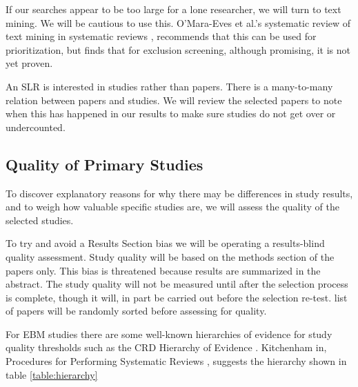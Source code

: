 If our searches appear to be too large for a lone researcher, we will turn to text mining.  
We will be cautious to use this.
O'Mara-Eves et al.'s systematic review of text mining in systematic reviews \cite{OMara-Eves_2015}, recommends that this can be used for prioritization, but finds that for exclusion screening, although promising, it is not yet proven.

An SLR is interested in studies rather than papers.
There is a many-to-many relation between papers and studies.
We will review the selected papers to note when this has happened in our results to make sure studies do not get over or undercounted.

\subsection{Quality of Primary Studies}
To discover explanatory reasons for why there may be differences in study results, and to weigh how valuable specific studies are, we will assess the quality of the selected studies.

To try and avoid a Results Section bias we will be operating a results-blind quality assessment.  
Study quality will be based on the methods section of the papers only.
This bias is threatened because results are summarized in the abstract.  
The study quality will not be measured until after the selection process is complete, though it will, in part be carried out before the selection re-test.
list of papers will be randomly sorted before assessing for quality.

For EBM studies there are some well-known hierarchies of evidence for study quality thresholds such as the CRD Hierarchy of Evidence \cite{Cochrane_2019}.
Kitchenham in, Procedures for Performing Systematic Reviews \cite{Kitchenham_2004_2}, suggests the hierarchy shown in table \ref{table:hierarchy}

